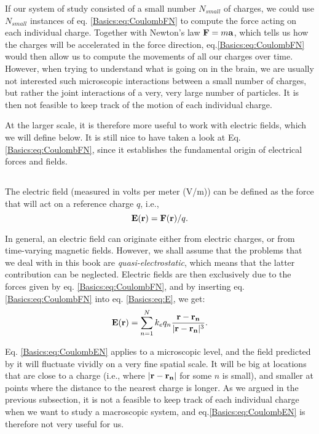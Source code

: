 If our system of study consisted of a small number $N_{small}$ of charges, we could use $N_{small}$ instances of eq. \ref{Basics:eq:CoulombFN} to compute the force acting on each individual charge. Together with Newton's law ${\bf F} = m {\bf a}$, which tells us how the charges will be accelerated in the force direction, eq.\ref{Basics:eq:CoulombFN} would then allow us to compute the movements of all our charges over time. However, when trying to understand what is going on in the brain, we are usually not interested such microscopic interactions between a small number of charges, but rather the joint interactions of a very, very large number of particles. It is then not feasible to keep track of the motion of each individual charge. 

At the larger scale, it is therefore more useful to work with electric fields, which we will define below. It is still nice to have taken a look at  Eq. \ref{Basics:eq:CoulombFN}, since it establishes the fundamental origin of electrical forces and fields. 


\subsection{}
The electric field (measured in volts per meter (V/m)) can be defined as the force that will act on a reference charge $q$, i.e., 
\begin{equation}
{\bf E}({\bf r}) = {\bf F}({\bf r})/q.
\label{Basics:eq:E}
\end{equation}

In general, an electric field can originate either from electric charges, or from time-varying magnetic fields. However, we shall assume that the problems that we deal with in this book are \textit{quasi-electrostatic}, which means that the latter contribution can be neglected. Electric fields are then exclusively due to the forces given by eq. \ref{Basics:eq:CoulombFN}, and by inserting eq. \ref{Basics:eq:CoulombFN} into eq. \ref{Basics:eq:E}, we get:
\begin{equation}
{\bf E}({\bf r}) = \sum_{n=1}^N k_e q_n \frac{{\bf r}-{\bf r_n}}{|{\bf r}-{\bf r_n}|^3}.
\label{Basics:eq:CoulombEN}
\end{equation}

Eq. \ref{Basics:eq:CoulombEN} applies to a microscopic level, and the field predicted by it will fluctuate vividly on a very fine spatial scale. It will be big at locations that are close to a charge (i.e., where $|{\bf r}-{\bf r_n}|$ for some $n$ is small), and smaller at points where the distance to the nearest charge is longer. As we argued in the previous subsection, it is not a feasible to keep track of each individual charge when we want to study a macroscopic system, and eq.\ref{Basics:eq:CoulombEN} is therefore not very useful for us.


